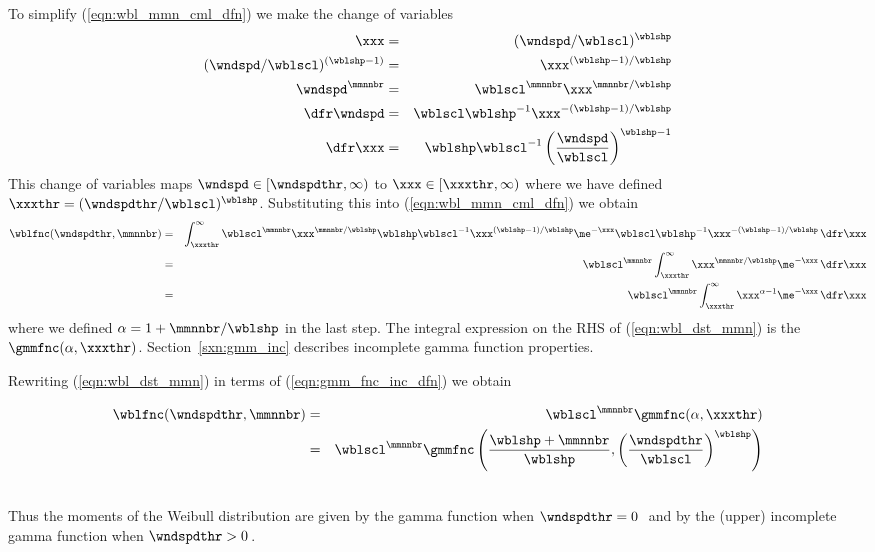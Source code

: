 \documentclass[12pt,twoside]{book}
\begin{document}
To simplify (\ref{eqn:wbl_mmn_cml_dfn}) we make the change of
variables  
\begin{eqnarray}
\xxx & = & (\wndspd/\wblscl)^{\wblshp} \nonumber \\
(\wndspd / \wblscl )^{(\wblshp - 1)} & = & \xxx^{(\wblshp - 1)/\wblshp} \nonumber \\
\wndspd^{\mmnnbr} & = & \wblscl^{\mmnnbr} \xxx^{\mmnnbr / \wblshp} \nonumber \\
\dfr\wndspd & = & \wblscl \wblshp^{-1} \xxx^{-(\wblshp - 1)/\wblshp} \nonumber \\
\dfr\xxx & = & \wblshp \wblscl^{-1} \left( \frac{\wndspd}{\wblscl}
\right)^{\wblshp - 1} 
\label{eqn:cov_x}
\end{eqnarray}
This change of variables maps 
$\wndspd \in [\wndspdthr,\infty)$ to
$\xxx \in [\xxxthr,\infty)$ where we have defined
$\xxxthr = (\wndspdthr/\wblscl)^{\wblshp}$.
Substituting this into (\ref{eqn:wbl_mmn_cml_dfn}) we obtain
\begin{eqnarray}
\wblfnc(\wndspdthr,\mmnnbr) & = &
\int_{\xxxthr}^{\infty} 
\wblscl^{\mmnnbr} \xxx^{\mmnnbr / \wblshp} \wblshp \wblscl^{-1} \xxx^{(\wblshp - 1)/\wblshp}
\me^{-\xxx} \wblscl \wblshp^{-1} \xxx^{-(\wblshp - 1)/\wblshp} \,\dfr\xxx
\nonumber \\
& = &
\wblscl^{\mmnnbr} \int_{\xxxthr}^{\infty} 
\xxx^{\mmnnbr / \wblshp} \me^{-\xxx} \,\dfr\xxx
\nonumber \\
& = &
\wblscl^{\mmnnbr} \int_{\xxxthr}^{\infty} 
\xxx^{\alpha - 1} \me^{-\xxx} \,\dfr\xxx
\label{eqn:wbl_dst_mmn}
\end{eqnarray}
where we defined $\alpha = 1 + \mmnnbr/\wblshp$ in the last step.
The integral expression on the RHS of (\ref{eqn:wbl_dst_mmn}) is
the  $\gmmfnc(\alpha,\xxxthr)$.
Section~\ref{sxn:gmm_inc} describes incomplete gamma function
properties. 

Rewriting (\ref{eqn:wbl_dst_mmn}) in terms of
(\ref{eqn:gmm_fnc_inc_dfn}) we obtain
\newline\parbox{6in}{ %
\begin{eqnarray*}
\wblfnc(\wndspdthr,\mmnnbr) & = &
\wblscl^{\mmnnbr} \gmmfnc(\alpha,\xxxthr) \\
& = &
\wblscl^{\mmnnbr} \gmmfnc \left( \frac{\wblshp + \mmnnbr}{\wblshp}, \left( \frac{\wndspdthr
}{\wblscl} \right)^{\wblshp} \right) 
\label{eqn:wbl_gmm_fnc_inc_dfn}
\end{eqnarray*}
}\hfill %
\parbox{1cm}{\begin{eqnarray}\label{eqn:wbl_gmm_dfn}\end{eqnarray}}\newline
Thus the moments of the Weibull distribution are given by the
gamma function when $\wndspdthr = 0$\,\mxs\ and by the (upper)
incomplete gamma function when $\wndspdthr > 0$\,\mxs.  
\end{document}
